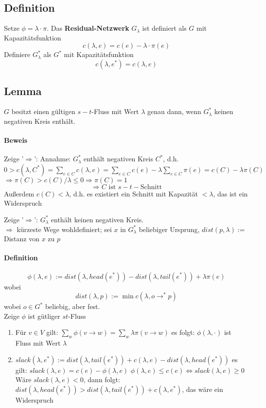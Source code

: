 \documentclass{article}
\newcommand{\df}[1]{\textbf{#1}\index{#1}}
\newcommand{\pfeil}{\rightarrow}
\begin{document}
\subsection{Definition}
Setze $\phi = \lambda \cdot \pi$. Das \df{Residual-Netzwerk} $G_\lambda$ ist definiert als $G$ mit Kapazitätsfunktion
\[ c(\lambda, e) = c(e) - \lambda \cdot \pi(e) \]
Definiere $G_\lambda^*$ als $G^*$ mit Kapazitätsfunktion
\[ c(\lambda, e^*) = c(\lambda, e) \]

\subsection{Lemma}
$G$ besitzt einen gültigen $s-t$-Fluss mit Wert $\lambda$ genau dann, wenn $G^*_\lambda$ keinen negativen Kreis enthält.

\paragraph{Beweis}
Zeige '$\Longrightarrow$': Annahme: $G^*_\lambda$ enthält negativen Kreis $C^*$, d.h.
$0 >c(\lambda, C^*) = \sum_{e \in C}c(\lambda,e)= \sum_{e\in C}c(e) - \lambda \sum_{e\in C}\pi(e) = c(C) - \lambda \pi(C)$
$\Longrightarrow \pi(C)  > c(C)/ \lambda \leq 0 \Longrightarrow \pi(C) = 1$
\[\Longrightarrow C \text{ ist } s-t-\text{Schnitt}\]
Außerdem $c(C) < \lambda$, d.h. es existiert ein Schnitt mit Kapazität $< \lambda$, das ist ein Widerspruch

Zeige '$\Longrightarrow$': $G_\lambda^*$ enthält keinen negativen Kreis.\\
$\Longrightarrow$ kürzeste Wege wohldefiniert;
sei $x$ in $G^*_\lambda$ beliebiger Ursprung, $dist(p,\lambda) := $ Distanz von $x$ zu $p$

\paragraph{Definition}
\[\phi(\lambda, e) := dist(\lambda, head(e^*)) - dist(\lambda, tail(e^*)) + \lambda \pi(e) \]
wobei
\[ dist(\lambda, p) := \min c(\lambda, o \pfeil^* p) \]
wobei $o \in G^*$ beliebig, aber fest.\\

Zeige $\phi$ ist gütliger $st$-Fluss
\begin{enumerate}
	\item Für $v \in V$ gilt: $\sum_{w}\phi(v \rightarrow w) = \sum_{w}\lambda \pi(v \rightarrow w)$
	es folgt: $\phi(\lambda, \cdot)$ ist Fluss mit Wert $\lambda$
	\item $slack(\lambda, e^*) := dist(\lambda, tail(e^*)) + c(\lambda, e) - dist(\lambda, head(e^*)) $
	es gilt: $slack(\lambda, e) = c(e) - \phi(\lambda, e)$
	$\phi(\lambda, e) \leq c(e) \Longleftrightarrow slack(\lambda, e) \geq 0$
	Wäre $slack(\lambda, e) < 0$, dann folgt: $dist(\lambda, head(e^*)) > dist(\lambda, tail(e^*)) + c(\lambda, e^*)$, das wäre ein Widerspruch
\end{enumerate}
\end{document}
